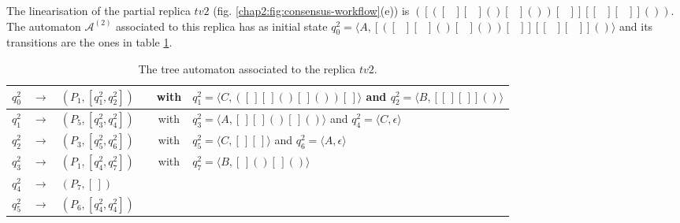 The linearisation of the partial replica $tv2$ (fig. \ref{chap2:fig:consensus-workflow}(e)) is $([([\textit{ }][\textit{ }]()[\textit{ }]())[\textit{ }]][[\textit{ }][\textit{ }]]())$. The automaton $\mathcal{A}^{(2)}$ associated to this replica has as initial state $q_{0}^{2}=\langle A,[([\textit{ }][\textit{ }]()[\textit{ }]())[\textit{ }]][[\textit{ }][\textit{ }]]() \rangle$ and its transitions are the ones in table \ref{chap2:automaton-a-c}. 
\begin{table}[ht]
	\caption{The tree automaton associated to the replica $tv2$.}
	\label{chap2:automaton-a-c}
	\begin{tabular}[t]{|lcp{5.7cm}|lcp{5cm}|}
	\hline
	$q_{0}^{2}$ & $\longrightarrow$ & $(P_{1}, [q_{1}^{2}, q_{2}^{2}])$ & & with & $q_{1}^{2}=\langle C,([\,][\,]()[\,]())[\,] \rangle$ and $q_{2}^{2}=\langle B,[[\,][\,]]() \rangle$\\
	\hline
	
	$q_{1}^{2}$ & $\longrightarrow$ & $(P_{5}, [q_{3}^{2}, q_{4}^{2}])$ & & with & $q_{3}^{2}=\langle A,[\,][\,]()[\,]() \rangle$ and $q_{4}^{2}=\langle C,\epsilon \rangle$\\
	\hline
	
	$q_{2}^{2}$ & $\longrightarrow$ & $(P_{3}, [q_{5}^{2}, q_{6}^{2}])$ & & with & $q_{5}^{2}=\langle C,[\,][\,] \rangle$ and $q_{6}^{2}=\langle A,\epsilon \rangle$\\
	\hline
	
	$q_{3}^{2}$ & $\longrightarrow$ & $(P_{1}, [q_{4}^{2}, q_{7}^{2}])$ & & with & $q_{7}^{2}=\langle B,[\,]()[\,]() \rangle$\\
	\hline
	
	$q_{4}^{2}$ & $\longrightarrow$ & $(P_{7}, [\,])$ & & &\\
	
	\hline
	
	$q_{5}^{2}$ & $\longrightarrow$ & $(P_{6}, [q_{4}^{2}, q_{4}^{2}])$ & & &\\
	

\end{tabular}
\end{table}
